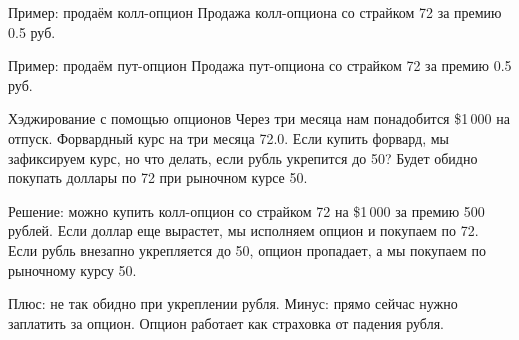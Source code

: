 \documentclass{beamer}
\begin{document}
\begin{frame}{Пример: продаём колл-опцион}
\justifying
Продажа колл-опциона со страйком 72 за премию 0.5 руб.

\justifying
\centering
\end{frame}



\begin{frame}{Пример: продаём пут-опцион}
\justifying
Продажа пут-опциона со страйком 72 за премию 0.5 руб.

\justifying
\centering
\end{frame}



\begin{frame}{Хэджирование с помощью опционов}
\justify
Через три месяца нам понадобится \$1\,000 на отпуск. Форвардный курс на три месяца 72.0. Если купить форвард, мы зафиксируем курс, но что делать, если рубль укрепится до 50? Будет обидно покупать доллары по 72 при рыночном курсе 50.

\justify
Решение: можно купить колл-опцион со страйком 72 на \$1\,000 за премию 500 рублей. Если доллар еще вырастет, мы исполняем опцион и покупаем по 72. Если рубль внезапно укрепляется до 50, опцион пропадает, а мы покупаем по рыночному курсу 50.

\justify
Плюс: не так обидно при укреплении рубля. Минус: прямо сейчас нужно заплатить за опцион. Опцион работает как страховка от падения рубля.
\end{frame}
\end{document}
